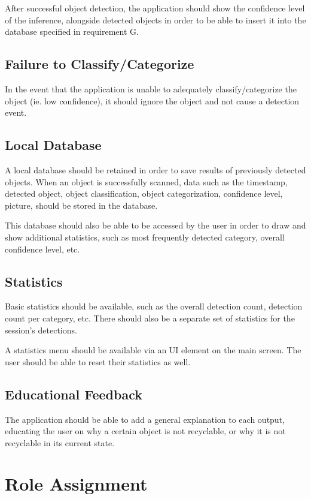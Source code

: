 \documentclass[conference]{IEEEtran}
\begin{document}
After successful object detection, the application should show the confidence level of the inference, alongside detected objects in order to be able to insert it into the database specified in requirement G.
\newline
\subsection{Failure to Classify/Categorize}

In the event that the application is unable to adequately classify/categorize the object (ie. low confidence), it should ignore the object and not cause a detection event.
\newline
\subsection{Local Database}
A local database should be retained in order to save results of previously detected objects. When an object is successfully scanned, data such as the timestamp, detected object, object classification, object categorization, confidence level, picture, should be stored in the database.

This database should also be able to be accessed by the user in order to draw and show additional statistics, such as most frequently detected category, overall confidence level, etc.
\newline
\subsection{Statistics}
Basic statistics should be available, such as the overall detection count, detection count per category, etc. There should also be a separate set of statistics for the session's detections.

A statistics menu should be available via an UI element on the main screen. The user should be able to reset their statistics as well.
\newline
\subsection{Educational Feedback}
The application should be able to add a general explanation to each output, educating the user on why a certain object is not recyclable, or why it is not recyclable in its current state.

\newpage
\section{Role Assignment}
\end{document}
